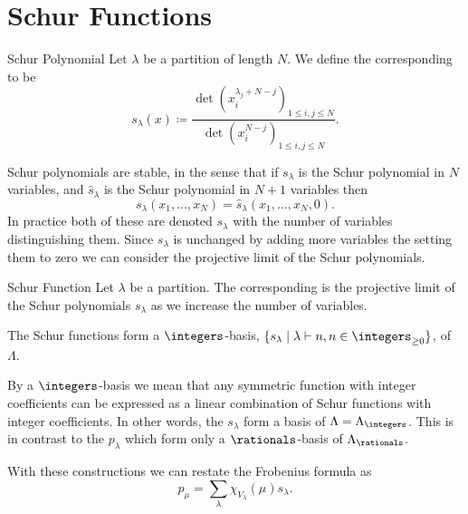 \section{Schur Functions}
\begin{dfn}{Schur Polynomial}{}
    Let \(\lambda\) be a partition of length \(N\).
    We define the corresponding  to be
    \begin{equation}
        s_\lambda(x) \coloneq \frac{\det(x_i^{\lambda_j + N - j})_{1 \le i, j \le N}}{\det(x_i^{N-j})_{1\le i,j\le N}}.
    \end{equation}
\end{dfn}

Schur polynomials are stable, in the sense that if \(s_\lambda\) is the Schur polynomial in \(N\) variables, and \(\hat{s}_\lambda\) is the Schur polynomial in \(N + 1\) variables then
\begin{equation}
    s_\lambda(x_1, \dotsc, x_N) = \hat{s}_\lambda(x_1, \dotsc, x_N, 0).
\end{equation}
In practice both of these are denoted \(s_\lambda\) with the number of variables distinguishing them.
Since \(s_\lambda\) is unchanged by adding more variables the setting them to zero we can consider the projective limit of the Schur polynomials.

\begin{dfn}{Schur Function}{}
    Let \(\lambda\) be a partition.
    The corresponding  is the projective limit of the Schur polynomials \(s_\lambda\) as we increase the number of variables.
\end{dfn}

\begin{thm}{}{}
    The Schur functions form a \(\integers\)-basis, \(\{s_\lambda \mid \lambda \partition n, n \in \integers_{\ge 0}\}\), of \(\Lambda\).
\end{thm}

By a \(\integers\)-basis we mean that any symmetric function with integer coefficients can be expressed as a linear combination of Schur functions with integer coefficients.
In other words, the \(s_\lambda\) form a basis of \(\Lambda = \Lambda_{\integers}\).
This is in contrast to the \(p_\lambda\) which form only a \(\rationals\)-basis of \(\Lambda_{\rationals}\).

With these constructions we can restate the Frobenius formula as
\begin{equation}
    p_\mu = \sum_\lambda \chi_{V_\lambda}(\mu) s_\lambda.
\end{equation}

